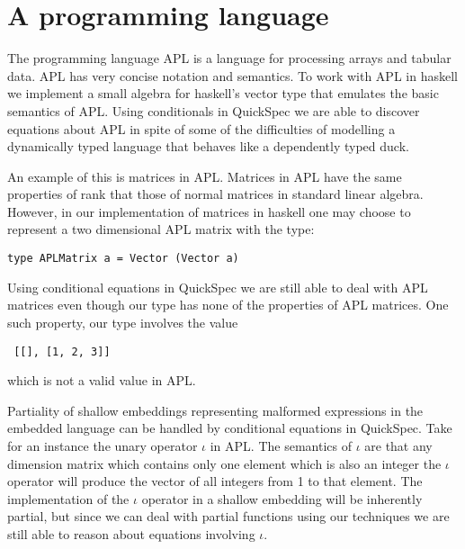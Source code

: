 \section{A programming language}
The programming language APL %
is a language for processing arrays and tabular data.
APL has very concise notation and semantics.
To work with APL in haskell we implement a small
algebra for haskell's vector type %
that emulates the basic semantics of APL.
Using conditionals in QuickSpec we are able to discover
equations about APL in spite of some of the
difficulties of modelling a dynamically typed language that 
behaves like a dependently typed duck.

An example of this is matrices in APL. Matrices in APL
have the same properties of rank that those of normal
matrices in standard linear algebra. However, in our implementation
of matrices in haskell one may choose to represent a two dimensional
APL matrix with the type:
\begin{verbatim}type APLMatrix a = Vector (Vector a)\end{verbatim}
Using conditional equations in QuickSpec we are still able to deal with
APL matrices even though our type has none of the properties of APL matrices.
One such property, our type involves the value \begin{verbatim} [[], [1, 2, 3]] \end{verbatim}
which is not a valid value in APL.

Partiality of shallow embeddings representing malformed expressions in the
embedded language can be handled by conditional equations in QuickSpec.
Take for an instance the unary operator $\iota$ in APL. The semantics
of $\iota$ are that any dimension matrix which contains only one element which is also
an integer the $\iota$ operator will produce the vector of all integers from 1 to that element.
The implementation of the $\iota$ operator in a shallow embedding will be inherently partial,
but since we can deal with partial functions using our techniques we are still able to reason
about equations involving $\iota$.
